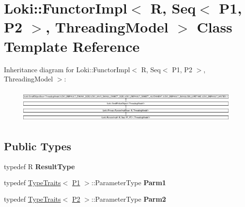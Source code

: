 \hypertarget{classLoki_1_1FunctorImpl_3_01R_00_01Seq_3_01P1_00_01P2_01_4_00_01ThreadingModel_01_4}{}\section{Loki\+:\+:Functor\+Impl$<$ R, Seq$<$ P1, P2 $>$, Threading\+Model $>$ Class Template Reference}
\label{classLoki_1_1FunctorImpl_3_01R_00_01Seq_3_01P1_00_01P2_01_4_00_01ThreadingModel_01_4}
Inheritance diagram for Loki\+:\+:Functor\+Impl$<$ R, Seq$<$ P1, P2 $>$, Threading\+Model $>$\+:\begin{figure}[H]
\begin{center}
\leavevmode
\includegraphics[height=1.751368cm]{classLoki_1_1FunctorImpl_3_01R_00_01Seq_3_01P1_00_01P2_01_4_00_01ThreadingModel_01_4}
\end{center}
\end{figure}
\subsection*{Public Types}
\begin{DoxyCompactItemize}
\item 
\hypertarget{classLoki_1_1FunctorImpl_3_01R_00_01Seq_3_01P1_00_01P2_01_4_00_01ThreadingModel_01_4_af29d5b7a488ef05e044ee3433f9bc885}{}typedef R {\bfseries Result\+Type}\label{classLoki_1_1FunctorImpl_3_01R_00_01Seq_3_01P1_00_01P2_01_4_00_01ThreadingModel_01_4_af29d5b7a488ef05e044ee3433f9bc885}

\item 
\hypertarget{classLoki_1_1FunctorImpl_3_01R_00_01Seq_3_01P1_00_01P2_01_4_00_01ThreadingModel_01_4_adad65d3d3dc1c8a690cc003c89c414c6}{}typedef \hyperlink{classLoki_1_1TypeTraits}{Type\+Traits}$<$ \hyperlink{structP1}{P1} $>$\+::Parameter\+Type {\bfseries Parm1}\label{classLoki_1_1FunctorImpl_3_01R_00_01Seq_3_01P1_00_01P2_01_4_00_01ThreadingModel_01_4_adad65d3d3dc1c8a690cc003c89c414c6}

\item 
\hypertarget{classLoki_1_1FunctorImpl_3_01R_00_01Seq_3_01P1_00_01P2_01_4_00_01ThreadingModel_01_4_a5993e9b24e664f44fff3935afedfc9bc}{}typedef \hyperlink{classLoki_1_1TypeTraits}{Type\+Traits}$<$ \hyperlink{structP2}{P2} $>$\+::Parameter\+Type {\bfseries Parm2}\label{classLoki_1_1FunctorImpl_3_01R_00_01Seq_3_01P1_00_01P2_01_4_00_01ThreadingModel_01_4_a5993e9b24e664f44fff3935afedfc9bc}

\end{DoxyCompactItemize}

